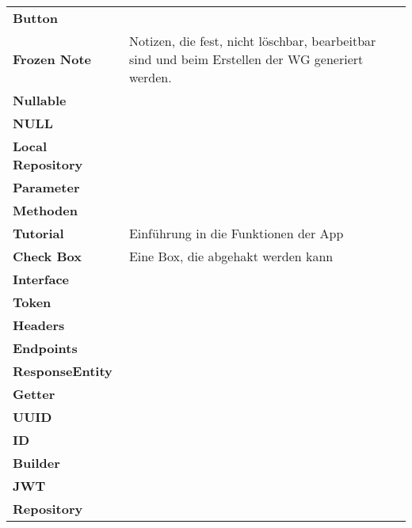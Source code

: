 \begin{table}[h!]
\begin{tabular}{p{4cm}p{10cm}}
				\textbf{Button} &   \\
				
				\textbf{Frozen Note} & Notizen, die fest, nicht löschbar, bearbeitbar sind und beim Erstellen der WG generiert werden.
   \\
				\textbf{Nullable} &   \\
				\textbf{NULL} &   \\
				\textbf{Local Repository} &   \\
				\textbf{Parameter} &   \\
				\textbf{Methoden} &   \\
				\textbf{Tutorial} &  Einführung in die Funktionen der App
   \\
				\textbf{Check Box} &  Eine Box, die abgehakt werden kann \\
				\textbf{Interface} &   \\
				\textbf{Token} &   \\
				\textbf{Headers} &   \\
				\textbf{Endpoints} &   \\
				\textbf{ResponseEntity} &   \\	
				\textbf{Getter} &   \\	
				\textbf{UUID} &   \\	
				\textbf{ID} &   \\	
				\textbf{Builder} &   \\	
				\textbf{JWT} &   \\	
				\textbf{Repository} &   \\	
				
			\end{tabular}
		\end{table}
	
		
